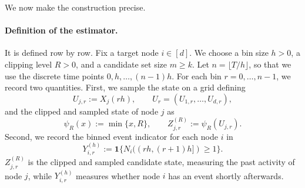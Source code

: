 \documentclass{article}
\newcommand{\ind}{\mathbf 1}
\begin{document}
We now make the construction precise.
\paragraph{Definition of the estimator.}
It is defined row by row. Fix a target node $i\in[d]$.
We choose a bin size $h>0$, a clipping level $R>0$, and a candidate set size $m\ge k$.
Let $n=\lfloor T/h\rfloor$,
so that we use the discrete time points $0,h,\dots,(n-1)h$.
For each bin $r=0,\dots,n-1$, we record two quantities.
First, we sample the state on a grid defining
\[
U_{j,r}:=X_j(rh),
\qquad
U_r=(U_{1,r},\dots,U_{d,r}),
\]
and the clipped and sampled state of node $j$ as
\[
\psi_R(x):=\min\{x,R\},
\qquad
Z_{j,r}^{(R)}:=\psi_R(U_{j,r}).
\]
Second, we record the binned event indicator for each node $i$ in
\[
Y_{i,r}^{(h)}:=\ind\{N_i((rh,(r+1)h])\ge 1\}.
\]
$Z_{j,r}^{(R)}$ is the clipped and sampled candidate state, measuring the past activity of node $j$, while $Y_{i,r}^{(h)}$ measures whether node $i$ has an event shortly afterwards.
\end{document}
